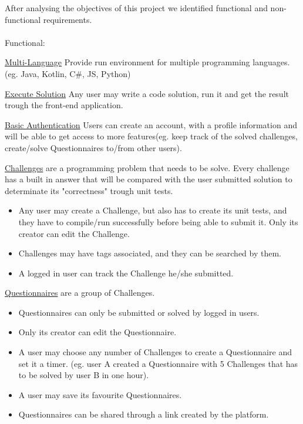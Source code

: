 \renewcommand{\labelitemii}{$\star$}
After analysing the objectives of this project we identified functional and non-functional requirements.
\\
\\
Functional:
\begin{description}[font=$\bullet$~\normalfont\scshape\color{red!50!black}]
\item \underline{Multi-Language} Provide run environment for multiple programming languages.(eg. Java, Kotlin, C\#, JS, Python)

\item \underline{Execute Solution} Any user may write a code solution, run it and get the result trough the front-end application.

\item \underline {Basic Authentication} Users can create an account, with a profile information and will be able to get access to more features(eg. keep track of the solved challenges, create/solve Questionnaires to/from other users).

\item \underline{Challenges} are a programming problem that needs to be solve. Every challenge has a built in answer that will be compared with the user submitted solution to determinate its "correctness" trough unit tests.
   \begin{itemize}
     \item Any user may create a Challenge, but also has to create its unit tests, and they have to compile/run successfully before being able to submit it. Only its creator can edit the Challenge.
     \item Challenges may have tags associated, and they can be searched by them.
     \item A logged in user can track the Challenge he/she submitted.
   \end{itemize}
\item \underline{Questionnaires} are a group of Challenges.
	\begin{itemize}
	\item Questionnaires can only be submitted or solved by logged in users.
	\item Only its creator can edit the Questionnaire.
    \item A user may choose any number of Challenges to create a Questionnaire and set it a timer. 
    (eg. user A created a Questionnaire with 5 Challenges that has to be solved by user B in one hour).
    \item A user may save its favourite Questionnaires.
    \item Questionnaires can be shared through a link created by the platform.
	\end{itemize}
\end{description}

